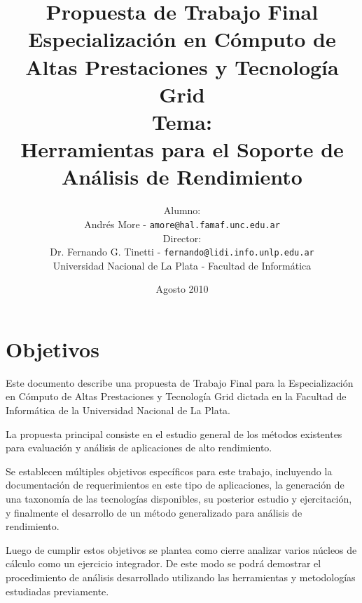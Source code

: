 \documentclass[a4paper]{article}
\begin{document}
\title{Propuesta de Trabajo Final\\
\bigskip
Especializaci\'on en C\'omputo de Altas Prestaciones y Tecnolog\'ia Grid\\
\bigskip
Tema:\\
Herramientas para el Soporte de An\'alisis de Rendimiento}

\author{Alumno:\\Andr\'es More - {\tt amore@hal.famaf.unc.edu.ar}
\\Director:\\Dr. Fernando G. Tinetti - {\tt fernando@lidi.info.unlp.edu.ar}
\bigskip
\\Universidad Nacional de La Plata - Facultad de Inform\'atica}

\date{Agosto 2010}

\maketitle

\newpage

\section{Objetivos}

  Este documento describe una propuesta de Trabajo Final para la
  Especializaci\'on en C\'omputo de Altas Prestaciones y Tecnolog\'ia Grid
  dictada en la Facultad de Inform\'atica de la Universidad Nacional de La
  Plata.

  \smallskip

  La propuesta principal consiste en el estudio general de los m\'etodos
  existentes para evaluaci\'on y an\'alisis de aplicaciones de alto
  rendimiento.

  \smallskip

  Se establecen m\'ultiples objetivos espec\'ificos para
  este trabajo, incluyendo la documentaci\'on de requerimientos en este
  tipo de aplicaciones, la generaci\'on de una taxonom\'ia de las
  tecnolog\'ias disponibles, su posterior estudio y ejercitaci\'on, y
  finalmente el desarrollo de un m\'etodo generalizado para an\'alisis de
  rendimiento.

  \smallskip

  Luego de cumplir estos objetivos se plantea como cierre analizar
  varios n\'ucleos de c\'alculo como un ejercicio integrador. De este modo
  se podr\'a demostrar el procedimiento de an\'alisis desarrollado
  utilizando las herramientas y metodolog\'ias estudiadas previamente.
\end{document}
